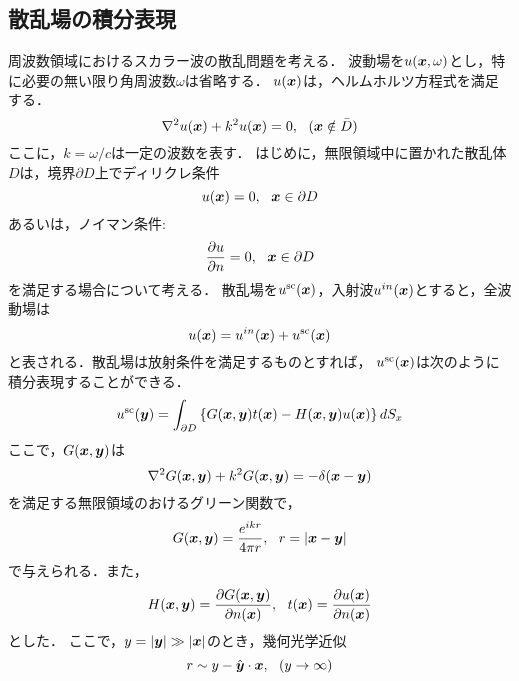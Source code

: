 \subsection{散乱場の積分表現}
周波数領域におけるスカラー波の散乱問題を考える．
波動場を$u(\mbox{\boldmath $x$},\omega)$とし，特に必要の無い限り角周波数$\omega$は省略する．
$u(\mbox{\boldmath $x$})$は，ヘルムホルツ方程式を満足する．
\begin{equation}
	\nabla^2 u(\fat{x}) + k^2 u(\fat{x}) =0, \ \ (\fat{x} \notin \bar{D})
	\label{eqn:}
\end{equation}
ここに，$k=\omega/c$は一定の波数を表す．
はじめに，無限領域中に置かれた散乱体$D$は，境界$\partial D$上でディリクレ条件
\begin{equation}
	u(\mbox{\boldmath $x$}) = 0, \ \ \mbox{\boldmath $x$}\in \partial D
	\label{eqn:}
\end{equation}
あるいは，ノイマン条件:
\begin{equation}
	\frac{\partial u}{\partial n} = 0 ,\ \ \mbox{\boldmath $x$}\in \partial D
	\label{eqn:}
\end{equation}
を満足する場合について考える．
散乱場を$u^{\rm sc}(\mbox{\boldmath $x$})$，入射波$u^{in}(\mbox{\boldmath $x$})$とすると，全波動場は
\begin{equation}
	u(\mbox{\boldmath $x$})=u^{in}(\mbox{\boldmath $x$})+ u^{\rm sc}(\mbox{\boldmath $x$})
	\label{eqn:}
\end{equation}
と表される．散乱場は放射条件を満足するものとすれば，
$u^{\rm sc}(\mbox{\boldmath $x$})$は次のように積分表現することができる．
\begin{equation}
	u^{\rm sc}(\mbox{\boldmath $y$}) = \int _{\partial D} 
	\left\{
		G(\mbox{\boldmath $x$},\mbox{\boldmath $y$})t(\mbox{\boldmath $x$})
	-
		H(\mbox{\boldmath $x$},\mbox{\boldmath $y$})u(\mbox{\boldmath $x$})
	\right\} dS_x
	\label{eqn:}
\end{equation}
ここで，$G(\mbox{\boldmath $x$},\mbox{\boldmath $y$})$は
\begin{equation}
	\nabla^2 G(\mbox{\boldmath $x$},\mbox{\boldmath $y$}) + k^2 G(\mbox{\boldmath $x$},\mbox{\boldmath $y$}) =-\delta (\mbox{\boldmath $x$}-\mbox{\boldmath $y$} )
	\label{eqn:}
\end{equation}
を満足する無限領域のおけるグリーン関数で，
\begin{equation}
	G(\mbox{\boldmath $x$},\mbox{\boldmath $y$}) =\frac{e^{ikr}}{4\pi r}, \ \ r=\left| \mbox{\boldmath $x$}-\mbox{\boldmath $y$} \right|
	\label{eqn:Green}
\end{equation}
で与えられる．また，
\begin{equation}
	H(\fat{x},\fat{y}) = \frac{\partial G(\fat{x},\fat{y})}{\partial n(\fat{x})}, \ \ 
	t(\fat{x}) =\frac{\partial u(\fat{x})}{\partial n(\fat{x})}
	\label{eqn:}
\end{equation}
とした．
ここで，$y=\left|\mbox{\boldmath $y$}\right|\gg \left| \mbox{\boldmath $x$} \right|$のとき，幾何光学近似
\begin{equation}
	r\sim  y  -\hat{\fat{y}}\cdot \fat{x}, \ \ (y\rightarrow \infty)
	\label{eqn:para}
\end{equation}
